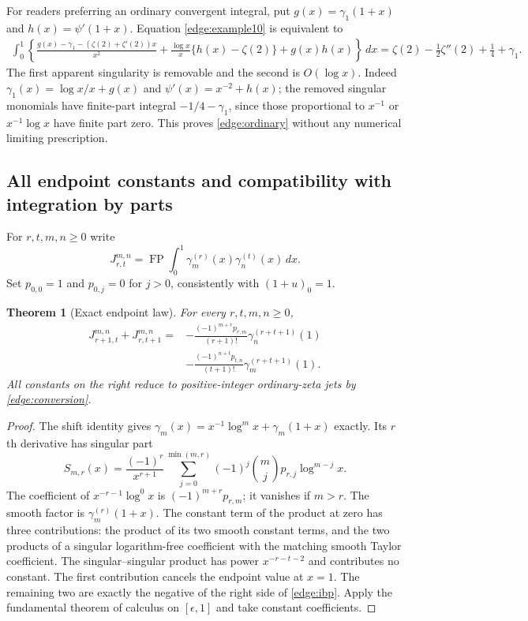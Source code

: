 \documentclass[11pt,letterpaper]{article}
\numberwithin{equation}{section}
\newtheorem{theorem}{Theorem}[section]
\theoremstyle{definition}
\theoremstyle{remark}
\begin{document}
For readers preferring an ordinary convergent integral, put
$g(x)=\gamma_1(1+x)$ and $h(x)=\psi'(1+x)$.
Equation \eqref{edge:example10} is equivalent to
\begin{equation}
 \begin{split}
 \int_0^1\left\{
   \frac{g(x)-\gamma_1-(\zeta(2)+\zeta'(2))x}{x^2}
  +\frac{\log x}{x}\{h(x)-\zeta(2)\}+g(x)h(x)
                  \right\}\,dx
 =\zeta(2)-\frac12\zeta''(2)+\frac14+\gamma_1.
 \end{split}
 \label{edge:ordinary}
\end{equation}
The first apparent singularity is removable and the second is
$O(\log x)$.  Indeed
$\gamma_1(x)=\log x/x+g(x)$ and $\psi'(x)=x^{-2}+h(x)$;
the removed singular monomials have finite-part integral
$-1/4-\gamma_1$, since those proportional to $x^{-1}$ or
$x^{-1}\log x$ have finite part zero.  This proves
\eqref{edge:ordinary} without any numerical limiting prescription.

\subsection{All endpoint constants and compatibility with integration by parts}

For $r,t,m,n\ge0$ write
\[
 J_{r,t}^{m,n}=\operatorname{FP}\int_0^1
                         \gamma_m^{(r)}(x)\gamma_n^{(t)}(x)\,dx.
\]
Set $p_{0,0}=1$ and $p_{0,j}=0$ for $j>0$, consistently with
$(1+u)_0=1$.

\begin{theorem}[Exact endpoint law]
\label{edge:endpoint}
For every $r,t,m,n\ge0$,
\begin{equation}
 \boxed{\begin{aligned}
 J_{r+1,t}^{m,n}+J_{r,t+1}^{m,n}
 ={}&-\frac{(-1)^{m+r}p_{r,m}}{(r+1)!}
                       \gamma_n^{(r+t+1)}(1)\\
    &-\frac{(-1)^{n+t}p_{t,n}}{(t+1)!}
                       \gamma_m^{(r+t+1)}(1).
 \end{aligned}}
 \label{edge:ibp}
\end{equation}
All constants on the right reduce to positive-integer ordinary-zeta
jets by \eqref{edge:conversion}.
\end{theorem}

\begin{proof}
The shift identity gives
$\gamma_m(x)=x^{-1}\log^m x+\gamma_m(1+x)$ exactly.
Its $r$th derivative has singular part
\[
 S_{m,r}(x)=\frac{(-1)^r}{x^{r+1}}
      \sum_{j=0}^{\min(m,r)}(-1)^j\binom mjp_{r,j}\log^{m-j}x.
\]
The coefficient of $x^{-r-1}\log^0x$ is
$(-1)^{m+r}p_{r,m}$; it vanishes if $m>r$.
The smooth factor is $\gamma_m^{(r)}(1+x)$.
The constant term of the product at zero has three contributions:
the product of its two smooth constant terms, and the two products
of a singular logarithm-free coefficient with the matching smooth
Taylor coefficient.  The singular--singular product has power
$x^{-r-t-2}$ and contributes no constant.
The first contribution cancels the endpoint value at $x=1$.
The remaining two are exactly the negative of the right side of
\eqref{edge:ibp}.  Apply the fundamental theorem of calculus on
$[\epsilon,1]$ and take constant coefficients.
\end{proof}
\end{document}
